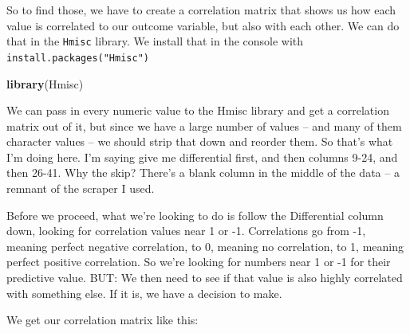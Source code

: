 \documentclass[
]{book}
\newenvironment{Shaded}{\begin{snugshade}}{\end{snugshade}}
\newcommand{\DecValTok}[1]{\textcolor[rgb]{0.00,0.00,0.81}{#1}}
\newcommand{\KeywordTok}[1]{\textcolor[rgb]{0.13,0.29,0.53}{\textbf{#1}}}
\newcommand{\NormalTok}[1]{#1}
\newcommand{\OperatorTok}[1]{\textcolor[rgb]{0.81,0.36,0.00}{\textbf{#1}}}
\newcommand{\StringTok}[1]{\textcolor[rgb]{0.31,0.60,0.02}{#1}}
\begin{document}
So to find those, we have to create a correlation matrix that shows us how each value is correlated to our outcome variable, but also with each other. We can do that in the \texttt{Hmisc} library. We install that in the console with \texttt{install.packages("Hmisc")}

\begin{Shaded}
\begin{Highlighting}[]
\KeywordTok{library}\NormalTok{(Hmisc)}
\end{Highlighting}
\end{Shaded}

We can pass in every numeric value to the Hmisc library and get a correlation matrix out of it, but since we have a large number of values -- and many of them character values -- we should strip that down and reorder them. So that's what I'm doing here. I'm saying give me differential first, and then columns 9-24, and then 26-41. Why the skip? There's a blank column in the middle of the data -- a remnant of the scraper I used.

\begin{Shaded}
\end{Shaded}

Before we proceed, what we're looking to do is follow the Differential column down, looking for correlation values near 1 or -1. Correlations go from -1, meaning perfect negative correlation, to 0, meaning no correlation, to 1, meaning perfect positive correlation. So we're looking for numbers near 1 or -1 for their predictive value. BUT: We then need to see if that value is also highly correlated with something else. If it is, we have a decision to make.

We get our correlation matrix like this:

\begin{Shaded}
\end{Shaded}
\end{document}
